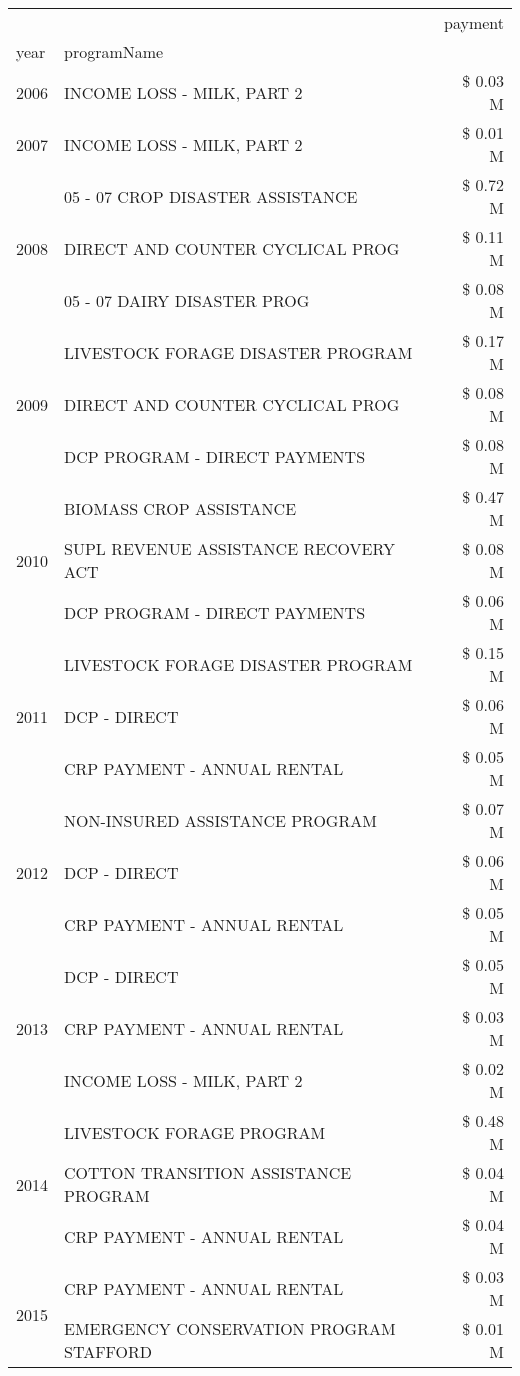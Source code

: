 \begin{tabular}{llr}
\toprule
 &  & payment \\
year & programName &  \\
\midrule
2006 & INCOME LOSS - MILK, PART 2 & \$ 0.03 M \\
\cline{1-3}
2007 & INCOME LOSS - MILK, PART 2 & \$ 0.01 M \\
\cline{1-3}
\multirow[t]{3}{*}{2008} & 05 - 07 CROP DISASTER ASSISTANCE & \$ 0.72 M \\
 & DIRECT AND COUNTER CYCLICAL PROG & \$ 0.11 M \\
 & 05 - 07 DAIRY DISASTER PROG & \$ 0.08 M \\
\cline{1-3}
\multirow[t]{3}{*}{2009} & LIVESTOCK FORAGE DISASTER  PROGRAM & \$ 0.17 M \\
 & DIRECT AND COUNTER CYCLICAL PROG & \$ 0.08 M \\
 & DCP PROGRAM - DIRECT PAYMENTS & \$ 0.08 M \\
\cline{1-3}
\multirow[t]{3}{*}{2010} & BIOMASS CROP ASSISTANCE & \$ 0.47 M \\
 & SUPL REVENUE ASSISTANCE RECOVERY ACT & \$ 0.08 M \\
 & DCP PROGRAM - DIRECT PAYMENTS & \$ 0.06 M \\
\cline{1-3}
\multirow[t]{3}{*}{2011} & LIVESTOCK FORAGE DISASTER PROGRAM & \$ 0.15 M \\
 & DCP - DIRECT & \$ 0.06 M \\
 & CRP PAYMENT - ANNUAL RENTAL & \$ 0.05 M \\
\cline{1-3}
\multirow[t]{3}{*}{2012} & NON-INSURED ASSISTANCE PROGRAM & \$ 0.07 M \\
 & DCP - DIRECT & \$ 0.06 M \\
 & CRP PAYMENT - ANNUAL RENTAL & \$ 0.05 M \\
\cline{1-3}
\multirow[t]{3}{*}{2013} & DCP - DIRECT & \$ 0.05 M \\
 & CRP PAYMENT - ANNUAL RENTAL & \$ 0.03 M \\
 & INCOME LOSS - MILK, PART 2 & \$ 0.02 M \\
\cline{1-3}
\multirow[t]{3}{*}{2014} & LIVESTOCK FORAGE PROGRAM & \$ 0.48 M \\
 & COTTON TRANSITION ASSISTANCE PROGRAM & \$ 0.04 M \\
 & CRP PAYMENT - ANNUAL RENTAL & \$ 0.04 M \\
\cline{1-3}
\multirow[t]{3}{*}{2015} & CRP PAYMENT - ANNUAL RENTAL & \$ 0.03 M \\
 & EMERGENCY CONSERVATION PROGRAM STAFFORD & \$ 0.01 M \\

\end{tabular}
